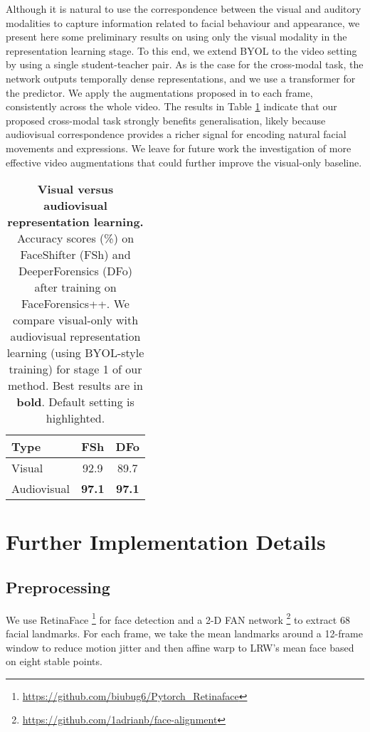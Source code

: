\documentclass[10pt,twocolumn,letterpaper]{article}
\begin{document}
\begin{description}[wide,itemindent=\labelsep]
\item[Visual-only representation learning.] Although it is natural to use the correspondence between the visual and auditory modalities to capture information related to facial behaviour and appearance, we present here some preliminary results on using only the visual modality in the representation learning stage. To this end, we extend BYOL to the video setting by using a single student-teacher pair. As is the case for the cross-modal task, the network outputs temporally dense representations, and we use a transformer for the predictor. We apply the augmentations proposed in \cite{grill2020bootstrap} to each frame, consistently across the whole video. The results in Table \ref{table:visual_only} indicate that our proposed cross-modal task strongly benefits generalisation, likely because audiovisual correspondence provides
a richer signal for encoding natural facial movements and
expressions. We leave for future work the investigation of more effective video augmentations that could further improve the visual-only baseline.

\begin{table}
\begin{center}
\begin{tabular}{l c c}\toprule
Type & FSh & DFo \\ \midrule
Visual & 92.9 & 89.7 \\ 
\rowcolor{light-gray}
Audiovisual & \textbf{97.1} & \textbf{97.1} \\ \bottomrule
\end{tabular}
\end{center}
\caption{\textbf{Visual versus audiovisual representation learning.} Accuracy scores (\%) on FaceShifter (FSh) and DeeperForensics (DFo) after training on FaceForensics++. We compare visual-only with audiovisual representation learning (using BYOL-style training) for stage 1 of our method. Best results are in \textbf{bold}. Default setting is \colorbox{light-gray}{highlighted}.}
\label{table:visual_only}
\end{table}

\end{description}

\section{Further Implementation Details} \label{sec:more_implementation_details}
\subsection{Preprocessing}
We use RetinaFace \cite{deng2020retinaface}\footnote{\url{https://github.com/biubug6/Pytorch_Retinaface}} for face detection and a 2-D FAN network \cite{bulat2017far}\footnote{\url{https://github.com/1adrianb/face-alignment}} to extract 68 facial landmarks. For each frame, we take the mean landmarks around a 12-frame window to reduce motion jitter and then affine warp to LRW's mean face based on eight stable points.
\end{document}
